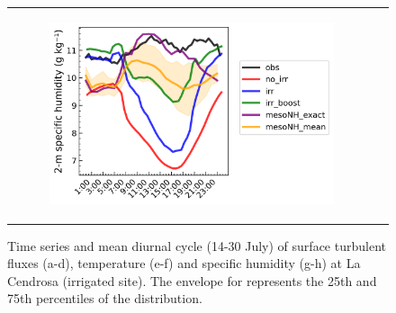 \begin{figure}[t]
\begin{tabular}{cc}
\begin{subfigure}[t]{0.5\textwidth}
            \includegraphics[width=\textwidth]{images/chap6/SOP_TS_DC/diurnal_cycle_cendrosa_q2m.png}
        \end{subfigure}
    \end{tabular}
    \caption{Time series and mean diurnal cycle (14-30 July) of surface turbulent fluxes (a-d), temperature (e-f) and specific humidity (g-h) at La Cendrosa (irrigated site). The envelope for \mesomean represents the 25th and 75th percentiles of the distribution.}
    \label{fig:cendrosa_surfacevars}
\end{figure}


